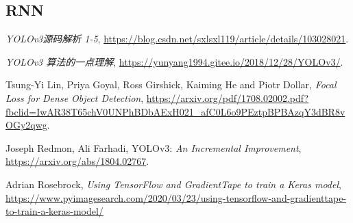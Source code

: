 \documentclass[10pt,a4paper]{article}
\begin{document}
\subsection{RNN}






\begin{thebibliography}{9}
    \textit{YOLOv3源码解析 1-5}, \url{https://blog.csdn.net/sxlsxl119/article/details/103028021}.

    \textit{YOLOv3 算法的一点理解}, \url{https://yunyang1994.gitee.io/2018/12/28/YOLOv3/}.

     Tsung-Yi Lin, Priya Goyal, Ross Girshick, Kaiming He and  Piotr Dollar, \textit{Focal Loss for Dense Object Detection}, \url{https://arxiv.org/pdf/1708.02002.pdf?fbclid=IwAR38T65chV0UNPhBDbAExH021_afC0L6o9PEztpBPBAzqY3dBR8vOGy2qwg}. 

     Joseph Redmon, Ali Farhadi, YOLOv3: \textit{An Incremental Improvement}, \url{https://arxiv.org/abs/1804.02767}.
    
     Adrian Rosebrock, \textit{Using TensorFlow and GradientTape to train a Keras model}, \url{https://www.pyimagesearch.com/2020/03/23/using-tensorflow-and-gradienttape-to-train-a-keras-model/}
\end{thebibliography}
\end{document}
